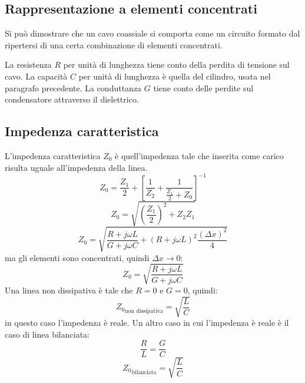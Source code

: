\subsection{Rappresentazione a elementi concentrati}
Si può dimostrare che un cavo coassiale si comporta come un circuito formato dal ripertersi di una certa combinazione di elementi concentrati.

La resistenza $R$ per unità di lunghezza tiene conto della perdita di tensione sul cavo. La capacità $C$ per unità di lunghezza è quella del cilindro, usata nel paragrafo precedente. La conduttanza $G$ tiene conto delle perdite sul condensatore attraverso il dielettrico.
\subsection{Impedenza caratteristica}
L'impedenza caratteristica $Z_0$ è quell'impedenza tale che inserita come carico risulta uguale all'impedenza della linea.
\begin{equation}
  Z_0=\frac{Z_1}{2}+\left[\frac{1}{Z_2}+\frac{1}{\frac{Z_1}{2}+Z_0}\right]^{-1}
\end{equation}
\begin{equation}
  Z_0=\sqrt{\left(\frac{Z_1}{2}\right)^2+Z_2Z_1}
\end{equation}
\begin{equation}
  Z_0=\sqrt{\frac{R+j\omega L}{G+j\omega C}+\left(R+j\omega L\right)^2\frac{(\Delta x)^2}{4}}
\end{equation}
ma gli elementi sono concentrati, quindi $\Delta x\to 0$:
\begin{equation}
  Z_0=\sqrt{\frac{R+j\omega L}{G+j\omega C}}
\end{equation}
Una linea non dissipativa è tale che $R=0$ e $G=0$, quindi:
\begin{equation}
  {Z_0}_\text{non dissipativa}=\sqrt{\frac{L}{C}}
\end{equation}
in questo caso l'impedenza è reale. Un altro caso in cui l'impedenza è reale è il caso di linea bilanciata:
\begin{equation}
  \frac{R}{L}=\frac{G}{C}
\end{equation}
\begin{equation}
  {Z_0}_\text{bilanciata}=\sqrt{\frac{L}{C}}
\end{equation}













